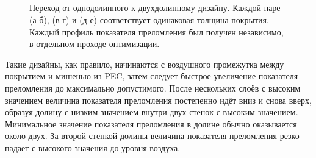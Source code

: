 \begin{figure}[p]
  \begin{minipage}[h]{0.45\textwidth}
  \end{minipage}
  \begin{minipage}[h]{0.45\textwidth}
  \end{minipage}\\
  \vspace{12pt}\\
  \begin{minipage}[h]{0.45\textwidth}
  \end{minipage}
  \begin{minipage}[h]{0.45\textwidth}
  \end{minipage}\\
  \vspace{12pt}\\
  \begin{minipage}[h]{0.45\textwidth}
  \end{minipage}
  \begin{minipage}[h]{0.45\textwidth}
  \end{minipage}%
  \caption{Переход от однодолинного к двухдолинному дизайну. Каждой
    паре (а-б), (в-г) и (д-е) соответствует одинаковая толщина
    покрытия. Каждый профиль показателя преломления был получен
    независимо, в отдельном проходе оптимизации.
    \label{img:transition}}%
\end{figure}
Такие дизайны, как правило, начинаются с воздушного промежутка между
покрытием и мишенью из PEC, затем следует быстрое увеличение
показателя преломления до максимально допустимого. После нескольких
слоёв с высоким значением величина показателя преломления постепенно
идёт вниз и снова вверх, образуя долину с низким значением внутри двух
стенок с высоким значением. Минимальное значение показателя
преломления в долине обычно оказывается около двух. За второй стенкой
долины величина показателя преломления резко падает с высокого значения до
уровня воздуха.


